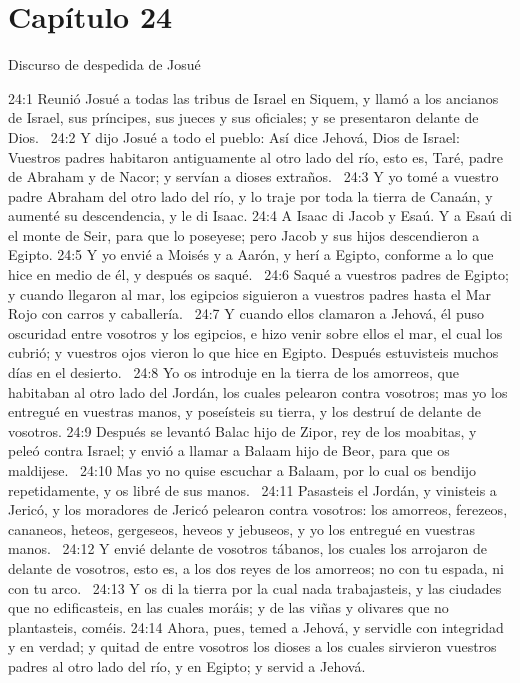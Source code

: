 \section*{Capítulo 24}
Discurso de despedida de Josué  

24:1 Reunió Josué a todas las tribus de Israel en Siquem, y llamó a los ancianos de Israel, sus príncipes, sus jueces y sus oficiales; y se presentaron delante de Dios.  
24:2 Y dijo Josué a todo el pueblo: Así dice Jehová, Dios de Israel: Vuestros padres habitaron antiguamente al otro lado del río, esto es, Taré, padre de Abraham y de Nacor; y servían a dioses extraños.  
24:3 Y yo tomé a vuestro padre Abraham del otro lado del río, y lo traje por toda la tierra de Canaán, y aumenté su descendencia, y le di Isaac. 
24:4 A Isaac di Jacob y Esaú. Y a Esaú di el monte de Seir, para que lo poseyese; pero Jacob y sus hijos descendieron a Egipto. 
24:5 Y yo envié a Moisés y a Aarón, y herí a Egipto, conforme a lo que hice en medio de él, y después os saqué.  
24:6 Saqué a vuestros padres de Egipto; y cuando llegaron al mar, los egipcios siguieron a vuestros padres hasta el Mar Rojo con carros y caballería.  
24:7 Y cuando ellos clamaron a Jehová, él puso oscuridad entre vosotros y los egipcios, e hizo venir sobre ellos el mar, el cual los cubrió; y vuestros ojos vieron lo que hice en Egipto. Después estuvisteis muchos días en el desierto.  
24:8 Yo os introduje en la tierra de los amorreos, que habitaban al otro lado del Jordán, los cuales pelearon contra vosotros; mas yo los entregué en vuestras manos, y poseísteis su tierra, y los destruí de delante de vosotros. 
24:9 Después se levantó Balac hijo de Zipor, rey de los moabitas, y peleó contra Israel; y envió a llamar a Balaam hijo de Beor, para que os maldijese.  
24:10 Mas yo no quise escuchar a Balaam, por lo cual os bendijo repetidamente, y os libré de sus manos.  
24:11 Pasasteis el Jordán, y vinisteis a Jericó, y los moradores de Jericó pelearon contra vosotros: los amorreos, ferezeos, cananeos, heteos, gergeseos, heveos y jebuseos, y yo los entregué en vuestras manos.  
24:12 Y envié delante de vosotros tábanos, los cuales los arrojaron de delante de vosotros, esto es, a los dos reyes de los amorreos; no con tu espada, ni con tu arco.  
24:13 Y os di la tierra por la cual nada trabajasteis, y las ciudades que no edificasteis, en las cuales moráis; y de las viñas y olivares que no plantasteis, coméis. 
24:14 Ahora, pues, temed a Jehová, y servidle con integridad y en verdad; y quitad de entre vosotros los dioses a los cuales sirvieron vuestros padres al otro lado del río, y en Egipto; y servid a Jehová.  

